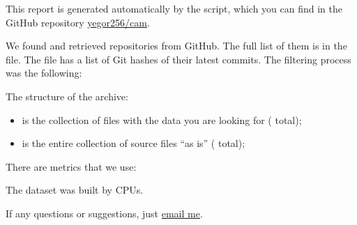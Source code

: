 \documentclass[nobrand,nosecurity]{huawei}
\begin{document}
\maketitle

This report is generated automatically by the script, which you can find in
the GitHub repository \href{https://github.com/yegor256/cam}{yegor256/cam}.

We found and retrieved \unskip{}
repositories from GitHub.
The full list of them is in the  file.
The  file has a list of Git hashes of their latest commits.
The filtering process was the following:

\begin{enumerate}
\unskip{}
\end{enumerate}

The structure of the archive:

\begin{itemize}
  \item {} is the collection of  files with the data
  you are looking for (\unskip{} total);

  \item {} is the entire collection of
  \unskip{}
  source files ``as is''
  (\unskip{} total);
\end{itemize}

There are \unskip{} metrics that we use:

\begin{itemize}
  
\end{itemize}

The dataset was built by
\unskip{}
CPUs\unskip{}.

If any questions or suggestions, just \href{mailto:yegor256@gmail.com}{email me}.
\end{document}
